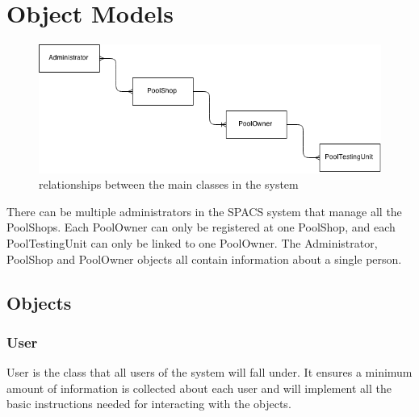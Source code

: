 \newcommand{\object}[3]{
\fbox{
\begin{tabular}[h!]{| p{7cm} |}
	\hline
	\textbf{#1} \\ \hline\hline
	\begin{mylist} #2 \end{mylist} \\ \hline
	\begin{mylist} #3 \end{mylist} \\ \hline

\end{tabular}
}
}

\newenvironment{mylist}{
	\begin{enumerate}[label=+]
}{
	\end{enumerate}
}

\section{Object Models}

\begin{figure}[h!]
\begin{center}
	\includegraphics[width=15cm]{images/ObjectRelations}
	\caption{relationships between the main classes in the system}
\end{center}
\end{figure}

\par
There can be multiple administrators in the SPACS system that manage all the PoolShops. Each PoolOwner can only be registered at one PoolShop, and each PoolTestingUnit can only be linked to one PoolOwner. The Administrator, PoolShop and PoolOwner objects all contain information about a single person.

\subsection{Objects}
\subsubsection{User}
User is the class that all users of the system will fall under. It ensures a minimum amount of information is collected about each user and will implement all the basic instructions needed for interacting with the objects.

